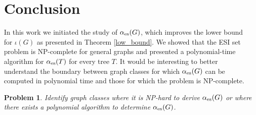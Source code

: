 \documentclass[11pt]{article}
\newtheorem{problem}[theorem]{Problem}
\newcommand{\io}{\iota}
\newcommand{\es}{\alpha_{\rm es}}
\begin{document}



\section{Conclusion}

In this work we initiated the study of $\es(G)$, which improves the lower bound for $\io(G)$ as presented in Theorem \ref{low_bound}. We showed that the ESI set problem is NP-complete for general graphs and presented a polynomial-time algorithm for $\es(T)$ for every tree $T$. It would be interesting to better understand the boundary between graph classes for which $\es(G)$ can be computed in polynomial time and those for which the problem is NP-complete.

\begin{problem}
Identify graph classes where it is NP-hard to derive $\es(G)$ or where there exists a polynomial algorithm to determine $\es(G)$.  
\end{problem}
\end{document}
